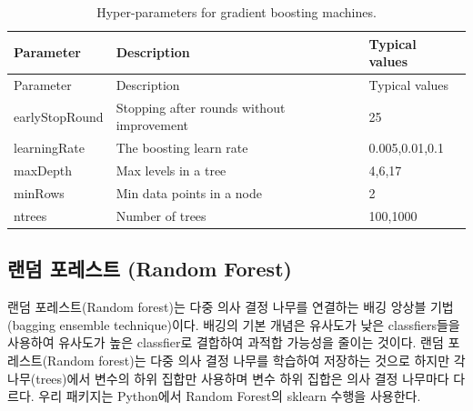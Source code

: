 \documentclass[11pt]{book}
\theoremstyle{definition}
\theoremstyle{definition}
\theoremstyle{definition}
\theoremstyle{remark}
\begin{document}
\begin{longtable}[]{@{}lll@{}}
\caption{\label{tab:gbmParameters} Hyper-parameters for gradient boosting
machines.}\tabularnewline
\toprule
Parameter & Description & Typical values\tabularnewline
\midrule
\endfirsthead
\toprule
Parameter & Description & Typical values\tabularnewline
\midrule
\endhead
earlyStopRound & Stopping after rounds without improvement &
25\tabularnewline
learningRate & The boosting learn rate & 0.005,0.01,0.1\tabularnewline
maxDepth & Max levels in a tree & 4,6,17\tabularnewline
minRows & Min data points in a node & 2\tabularnewline
ntrees & Number of trees & 100,1000\tabularnewline
\bottomrule
\end{longtable}

\subsection{랜덤 포레스트 (Random Forest)}\label{--random-forest}

랜덤 포레스트(Random forest)는 다중 의사 결정 나무를 연결하는 배깅
앙상블 기법(bagging ensemble technique)이다. 배깅의 기본 개념은 유사도가
낮은 classfiers들을 사용하여 유사도가 높은 classfier로 결합하여 과적합
가능성을 줄이는 것이다. 랜덤 포레스트(Random forest)는 다중 의사 결정
나무를 학습하여 저장하는 것으로 하지만 각 나무(trees)에서 변수의 하위
집합만 사용하며 변수 하위 집합은 의사 결정 나무마다 다르다. 우리
패키지는 Python에서 Random Forest의 sklearn 수행을 사용한다.
  
\end{document}
